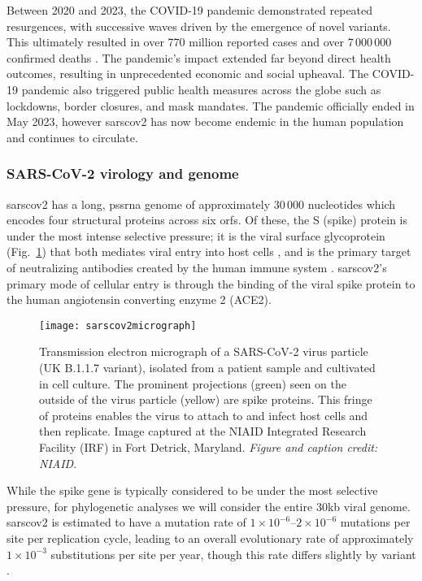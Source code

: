 Between 2020 and 2023, the COVID-19 pandemic demonstrated repeated resurgences, with successive waves driven by the emergence of novel variants.
This ultimately resulted in over 770 million reported cases and over 7\,000\,000 confirmed deaths \citep{ourworldindata-covid-explorer}.
The pandemic's impact extended far beyond direct health outcomes, resulting in unprecedented economic and social upheaval.
The COVID-19 pandemic also triggered public health measures across the globe such as lockdowns, border closures, and mask mandates.
The pandemic officially ended in May 2023, however \gls{sarscov2} has now become endemic in the human population and continues to circulate.

\subsubsection{SARS-CoV-2 virology and genome}
\gls{sarscov2} has a long, \gls{pssrna} genome of approximately 30\,000 nucleotides which encodes four structural proteins across six \gls{orf}s.
Of these, the S (spike) protein is under the most intense selective pressure; it is the viral surface glycoprotein (Fig.~\ref{fig:sarscov2micrograph}) that both mediates viral entry into host cells \citep{zhu2021molecular}, and is the primary target of neutralizing antibodies created by the human immune system \citep{v2021coronavirus}.
\gls{sarscov2}'s primary mode of cellular entry is through the binding of the viral spike protein to the human angiotensin converting enzyme 2 (ACE2).

\begin{figure}[ht]
  \centering
  \texttt{[image: sarscov2micrograph]}
  \caption[SARS-CoV-2 electron micrograph]{Transmission electron micrograph of a SARS-CoV-2 virus particle (UK B.1.1.7 variant), isolated from a patient sample and cultivated in cell culture. The prominent projections (green) seen on the outside of the virus particle (yellow) are spike proteins. This fringe of proteins enables the virus to attach to and infect host cells and then replicate. Image captured at the NIAID Integrated Research Facility (IRF) in Fort Detrick, Maryland.
  \textit{Figure and caption credit: NIAID}.
  }
  \label{fig:sarscov2micrograph}
\end{figure}

While the spike gene is typically considered to be under the most selective pressure, for phylogenetic analyses we will consider the entire 30kb viral genome.
\gls{sarscov2} is estimated to have a mutation rate of $1\times10^{-6}$--$2\times10^{-6}$ mutations per site per replication cycle, leading to an overall evolutionary rate of approximately $1\times10^{-3}$ substitutions per site per year, though this rate differs slightly by variant \citep{markov2023evolution}.

